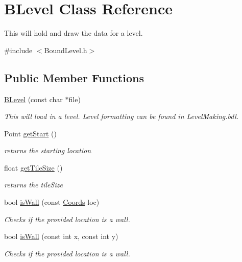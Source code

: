 \hypertarget{class_b_level}{\section{\-B\-Level \-Class \-Reference}
\label{class_b_level}
}


\-This will hold and draw the data for a level.  




{\ttfamily \#include $<$\-Bound\-Level.\-h$>$}

\subsection*{\-Public \-Member \-Functions}
\begin{DoxyCompactItemize}
\item 
\hyperlink{class_b_level_a8e48d62f02a21d2a57c682dc7737396f}{\-B\-Level} (const char $\ast$file)
\begin{DoxyCompactList}\small\item\em \-This will load in a level. \-Level formatting can be found in \-Level\-Making.\-bdl. \end{DoxyCompactList}\item 
\-Point \hyperlink{class_b_level_ad4f4a9f5658ac8ed21917df61678f4b2}{get\-Start} ()
\begin{DoxyCompactList}\small\item\em returns the starting location \end{DoxyCompactList}\item 
float \hyperlink{class_b_level_a8d02e52b25ff8c39bb68d0880c31771c}{get\-Tile\-Size} ()
\begin{DoxyCompactList}\small\item\em returns the tile\-Size \end{DoxyCompactList}\item 
bool \hyperlink{class_b_level_abb407d85aebcc0d6cded1ad13c2e2eed}{is\-Wall} (const \hyperlink{struct_coords}{\-Coords} loc)
\begin{DoxyCompactList}\small\item\em \-Checks if the provided location is a wall. \end{DoxyCompactList}\item 
bool \hyperlink{class_b_level_a7520cdd30191a75a7811c42ee1758e65}{is\-Wall} (const int x, const int y)
\begin{DoxyCompactList}\small\item\em \-Checks if the provided location is a wall. \end{DoxyCompactList}\item 

\end{DoxyCompactItemize}
